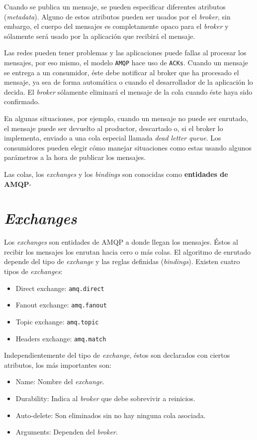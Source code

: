Cuando se publica un mensaje, se pueden especificar diferentes atributos (\emph{metadata}).
Alguno de estos atributos pueden ser usados por el \emph{broker}, sin embargo,
el cuerpo del mensajes es completamente opaco para el \emph{broker} y sólamente
será usado por la aplicación que recibirá el mensaje.

Las redes pueden tener problemas y las aplicaciones puede fallas al procesar los
mensajes, por eso mismo, el modelo \texttt{AMQP} hace uso de \texttt{ACKs}. Cuando
un mensaje se entrega a un consumidor, éste debe notificar al broker que ha procesado
el mensaje, ya sea de forma automática o cuando el desarrollador de la aplicación
lo decida. El \emph{broker} sólamente eliminará el mensaje de la cola cuando
éste haya sido confirmado.

En algunas situaciones, por ejemplo, cuando un mensaje no puede ser enrutado,
el mensaje puede ser devuelto al productor, descartado o, si el broker lo implementa,
enviado a una cola especial llamada \emph{dead letter queue}. Los consumidores pueden
elegir cómo manejar situaciones como estas usando algunos parámetros a la hora de
publicar los mensajes.

Las colas, los \emph{exchanges} y los \emph{bindings} son conocidas como
\textbf{entidades de AMQP}-

\section{\emph{Exchanges}}

Los \emph{exchanges} son entidades de AMQP a donde llegan los mensajes. Éstos
al recibir los mensajes los enrutan hacia cero o más colas. El algoritmo de
enrutado depende del tipo de \emph{exchange} y las reglas definidas (\emph{bindings}).
Existen cuatro tipos de \emph{exchanges}:

\begin{itemize}\itemsep1pt \parskip0pt 
\item Direct exchange: \texttt{amq.direct}
\item Fanout exchange: \texttt{amq.fanout}
\item Topic exchange:	\texttt{amq.topic}
\item Headers exchange:	\texttt{amq.match}
\end{itemize}

Independientemente del tipo de \emph{exchange}, éstos son declarados con ciertos
atributos, los más importantes son:

\begin{itemize}\itemsep1pt \parskip0pt 
\item Name: Nombre del \emph{exchange}.
\item Durability: Indica al \emph{broker} que debe sobrevivir a
reinicios.
\item Auto-delete: Son eliminados sin no hay ninguna cola asociada.
\item Arguments: Dependen del \emph{broker}.
\end{itemize}

